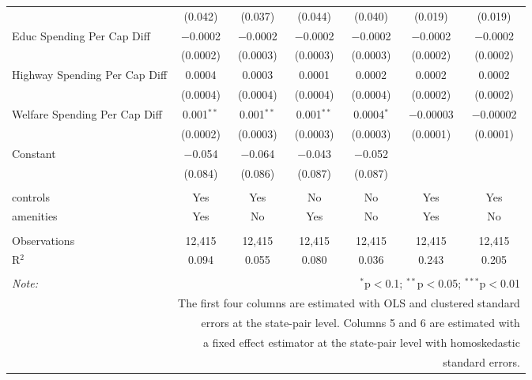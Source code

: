 \begin{table}[!htbp]
\begin{tabular}{@{\extracolsep{5pt}}lcccccc}
  & (0.042) & (0.037) & (0.044) & (0.040) & (0.019) & (0.019) \\ 
  Educ Spending Per Cap Diff & $-$0.0002 & $-$0.0002 & $-$0.0002 & $-$0.0002 & $-$0.0002 & $-$0.0002 \\ 
  & (0.0002) & (0.0003) & (0.0003) & (0.0003) & (0.0002) & (0.0002) \\ 
  Highway Spending Per Cap Diff & 0.0004 & 0.0003 & 0.0001 & 0.0002 & 0.0002 & 0.0002 \\ 
  & (0.0004) & (0.0004) & (0.0004) & (0.0004) & (0.0002) & (0.0002) \\ 
  Welfare Spending Per Cap Diff & 0.001$^{**}$ & 0.001$^{**}$ & 0.001$^{**}$ & 0.0004$^{*}$ & $-$0.00003 & $-$0.00002 \\ 
  & (0.0002) & (0.0003) & (0.0003) & (0.0003) & (0.0001) & (0.0001) \\ 
  Constant & $-$0.054 & $-$0.064 & $-$0.043 & $-$0.052 &  &  \\ 
  & (0.084) & (0.086) & (0.087) & (0.087) &  &  \\ 
 \hline \\[-1.8ex] 
controls & Yes & Yes & No & No & Yes & Yes \\ 
amenities & Yes & No & Yes & No & Yes & No \\ 
\hline \\[-1.8ex] 
Observations & 12,415 & 12,415 & 12,415 & 12,415 & 12,415 & 12,415 \\ 
R$^{2}$ & 0.094 & 0.055 & 0.080 & 0.036 & 0.243 & 0.205 \\ 
\hline 
\hline \\[-1.8ex] 
\textit{Note:}  & \multicolumn{6}{r}{$^{*}$p$<$0.1; $^{**}$p$<$0.05; $^{***}$p$<$0.01} \\ 
 & \multicolumn{6}{r}{The first four columns are estimated with OLS and clustered standard} \\ 
 & \multicolumn{6}{r}{ errors at the state-pair level. Columns 5 and 6 are estimated with} \\ 
 & \multicolumn{6}{r}{a fixed effect estimator at the state-pair level with homoskedastic} \\ 
 & \multicolumn{6}{r}{standard errors.} \\ 
\end{tabular} 
\end{table} 
